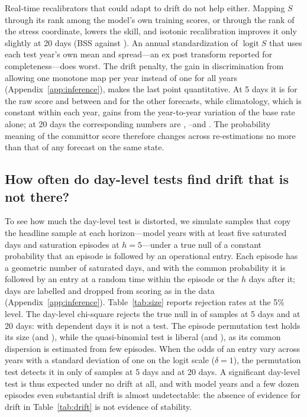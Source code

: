 \documentclass[preprint,12pt,authoryear]{elsarticle}
\newcommand{\Sraw}{S}
\begin{document}
Real-time recalibrators that could adapt to drift do not help either. Mapping $\Sraw$ through its rank among the model's own training scores, or through the rank of the stress coordinate, lowers the skill, and isotonic recalibration improves it only slightly at 20 days (BSS \IsoTwenty against \SeqTwenty). An annual standardization of $\operatorname{logit}\Sraw$ that uses each test year's own mean and spread---an ex post transform reported for completeness---does worst. The drift penalty, the gain in discrimination from allowing one monotone map per year instead of one for all years (Appendix~\ref{app:inference}), makes the last point quantitative. At 5 days it is \PenRawFive for the raw score and between \PenOthLoFive and \PenOthHiFive for the other forecasts, while climatology, which is constant within each year, gains \PenClimFive from the year-to-year variation of the base rate alone; at 20 days the corresponding numbers are \PenRawTwenty, \PenOthLoTwenty--\PenOthHiTwenty and \PenClimTwenty. The probability meaning of the committor score therefore changes across re-estimations no more than that of any forecast on the same state.

\subsection{How often do day-level tests find drift that is not there?}\label{sec:size}
To see how much the day-level test is distorted, we simulate samples that copy the headline sample at each horizon---\SimYearsFive model years with at least five saturated days and \SimEpisFive saturation episodes at $h=5$---under a true null of a constant probability that an episode is followed by an operational entry. Each episode has a geometric number of saturated days, and with the common probability it is followed by an entry at a random time within the episode or the $h$ days after it; days are labelled and dropped from scoring as in the data (Appendix~\ref{app:inference}). Table~\ref{tab:size} reports rejection rates at the 5\% level. The day-level chi-square rejects the true null in \SizeChiFive of samples at 5 days and \SizeChiTwenty at 20 days: with dependent days it is not a test. The episode permutation test holds its size (\SizePermFive and \SizePermTwenty), while the quasi-binomial test is liberal (\SizeQBFive and \SizeQBTwenty), as its common dispersion is estimated from few episodes. When the odds of an entry vary across years with a standard deviation of one on the logit scale ($\delta=1$), the permutation test detects it in only \PowPermFive of samples at 5 days and \PowPermTwenty at 20 days. A significant day-level test is thus expected under no drift at all, and with \SimYearsFive model years and a few dozen episodes even substantial drift is almost undetectable: the absence of evidence for drift in Table~\ref{tab:drift} is not evidence of stability.
\end{document}
